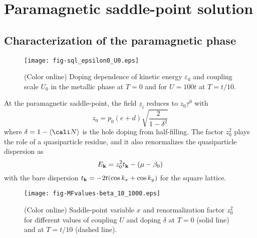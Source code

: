 \documentclass[showpacs,amsmath,twocolumn,floatfix]{revtex4-1}
\begin{document}
 
\section{Paramagnetic saddle-point solution} \label{sec:saddle}

\subsection{Characterization of the paramagnetic phase}


\begin{figure}[b]
   \texttt{[image: fig-sql\_epsilon0\_U0.eps]}
	\caption{(Color online) Doping dependence of kinetic energy $\varepsilon_0$ 
	and coupling scale $U_0$ in the metallic phase at $T=0$ and for $U=100t$ 
	at $T=t/10$.}
	\label{fig:eps0_U0}
\end{figure}

At the paramagnetic saddle-point, the field $\underline{z}_i$ reduces to 
$z_0 \underline{\tau}^0$ with
 \begin{equation}
 z_0=p_0(e+d)\sqrt{\frac{2}{1-\delta^2}}
 \end{equation}
where $\delta = 1 - \langle {\cali N} \rangle$ is the hole doping from 
half-filling. The factor $z_0^2$ plays the role of a quasiparticle 
residue, and it also renormalizes the quasiparticle dispersion as 
\begin{equation}
 E_{{\bf k}} = z_0^2 t_{{\bf k}} - (\mu - \beta_0)
\end{equation}
with the bare dispersion $t_{{\bf k}} = -2t(\cos k_x +\cos k_y)$ for the 
square lattice. 

\begin{figure}[b]
	 \texttt{[image: fig-MFvalues-beta\_10\_1000.eps]}
	\caption{(Color online) Saddle-point variable $x$ and renormalization 
	factor $z_0^2$ for different values of coupling $U$ and doping $\delta$ 
	at $T=0$ (solid line) and at $T=t/10$ (dashed line).}
	\label{fig:x-z2}
\end{figure}
\end{document}
